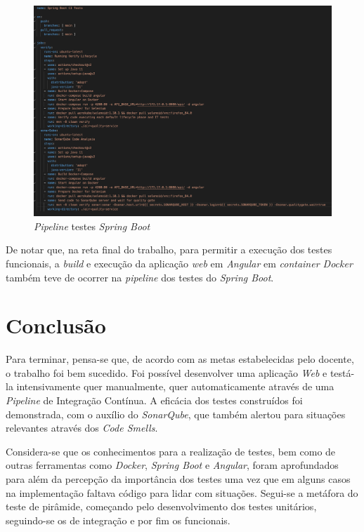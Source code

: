 \documentclass[10pt,english]{article}
\begin{document}
\begin{figure}[h]
    \centering
    \includegraphics[width=450]{images/pipeline-spring.png}
    \caption{\textit{Pipeline} testes \textit{Spring Boot}}
\end{figure}

\par De notar que, na reta final do trabalho, para permitir a execução dos testes funcionais, a \textit{build} e execução da aplicação \textit{web} em \textit{Angular} em \textit{container Docker} também teve de ocorrer na \textit{pipeline} dos testes do \textit{Spring Boot}.

\clearpage

\section{Conclusão}

\par Para terminar, pensa-se que, de acordo com as metas estabelecidas pelo docente, o trabalho foi bem sucedido. Foi possível desenvolver uma aplicação \textit{Web} e testá-la intensivamente quer manualmente, quer automaticamente através de uma \textit{Pipeline} de Integração Contínua. A eficácia dos testes construídos foi demonstrada, com o auxílio do \textit{SonarQube}, que também alertou para situações relevantes através dos \textit{Code Smells}.

\par Considera-se que os conhecimentos para a realização de testes, bem como de outras ferramentas como \textit{Docker}, \textit{Spring Boot} e \textit{Angular}, foram aprofundados para além da percepção da importância dos testes uma vez que em alguns casos na implementação faltava código para lidar com situações. Segui-se a metáfora do teste de pirâmide, começando pelo desenvolvimento dos testes unitários, seguindo-se os de integração e por fim os funcionais.
\end{document}
